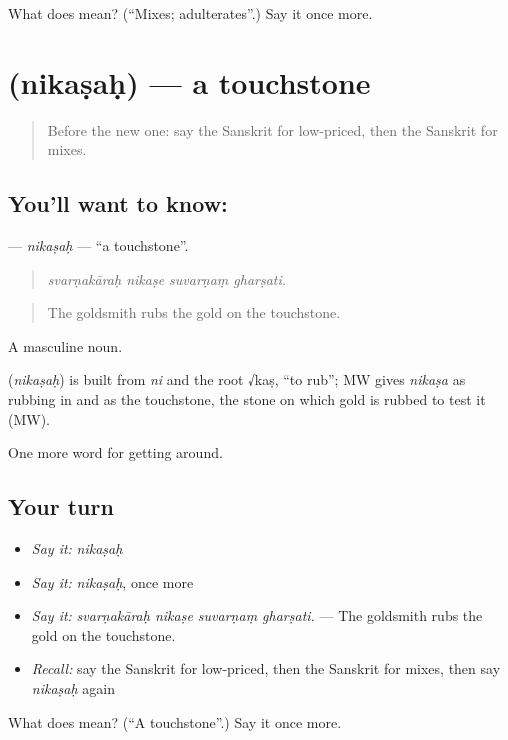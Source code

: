 \begin{tcolorbox}[breakable,colback=teal!4,colframe=teal!35!black,title={Before you move on}]
What does  mean? (\textquotedblleft{}Mixes; adulterates\textquotedblright{}.) Say it once more.
\end{tcolorbox}
\section[\texorpdfstring{\sk{निकषः} (nikaṣaḥ)}{निकषः (nikaṣaḥ)}]{ (nikaṣaḥ) — a touchstone}

\label{lesson:SA-C431-nikasah}



\begin{quote}
Before the new one: say the Sanskrit for low-priced, then the Sanskrit for mixes.
\end{quote}

\subsection*{You'll want to know: }
\textbf{} — \emph{nikaṣaḥ} — \textquotedblleft{}a touchstone\textquotedblright{}.

\begin{quote}
   
\end{quote}

\begin{quote}
\emph{svarṇakāraḥ nikaṣe suvarṇaṃ gharṣati.}
\end{quote}

\begin{quote}
The goldsmith rubs the gold on the touchstone.
\end{quote}

A masculine noun.

\begin{cousinweb}
\textbf{} (\emph{nikaṣaḥ}) is built from \emph{ni} and the root √kaṣ, \textquotedblleft{}to rub\textquotedblright{}; MW gives \emph{nikaṣa} as rubbing in and as the touchstone, the stone on which gold is rubbed to test it (MW).
\end{cousinweb}

\begin{grammarlens}[title={What you've built}]
One more word for getting around.
\end{grammarlens}

\subsection*{Your turn}
\begin{itemize}
\raggedright
  \item \emph{Say it:} \emph{nikaṣaḥ}
  \item \emph{Say it:} \emph{nikaṣaḥ}, once more
  \item \emph{Say it:} \emph{svarṇakāraḥ nikaṣe suvarṇaṃ gharṣati.} — The goldsmith rubs the gold on the touchstone.
  \item \emph{Recall:} say the Sanskrit for low-priced, then the Sanskrit for mixes, then say \emph{nikaṣaḥ} again
\end{itemize}

\begin{tcolorbox}[breakable,colback=teal!4,colframe=teal!35!black,title={Before you move on}]
What does  mean? (\textquotedblleft{}A touchstone\textquotedblright{}.) Say it once more.
\end{tcolorbox}
